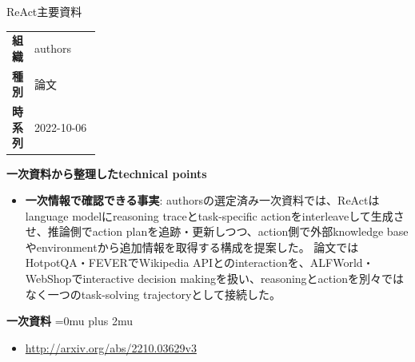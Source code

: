 \begin{technicalnote}{ReAct}{主要資料}
\begingroup
\begin{tabularx}{\linewidth}{@{}>{\bfseries}p{0.22\linewidth}X@{}}
組織 & authors \\
種別 & 論文 \\
時系列 & 2022-10-06 \\
\end{tabularx}
\smallskip
{\bfseries 一次資料から整理したtechnical points}
\begin{itemize}[leftmargin=1.5em,itemsep=0.35em]
\item \textbf{一次情報で確認できる事実}: authorsの選定済み一次資料では、ReActはlanguage modelにreasoning traceとtask-specific actionをinterleaveして生成させ、推論側でaction planを追跡・更新しつつ、action側で外部knowledge baseやenvironmentから追加情報を取得する構成を提案した。 論文ではHotpotQA・FEVERでWikipedia APIとのinteractionを、ALFWorld・WebShopでinteractive decision makingを扱い、reasoningとactionを別々ではなく一つのtask-solving trajectoryとして接続した。
\end{itemize}
\begin{minipage}{\linewidth}
\begin{samepage}
{\bfseries 一次資料}
\begingroup\sloppy
\Urlmuskip=0mu plus 2mu\relax
\begin{itemize}[leftmargin=1.5em,itemsep=0.25em]
\item {\scriptsize\url{http://arxiv.org/abs/2210.03629v3}}
\end{itemize}
\endgroup
\end{samepage}
\end{minipage}
\endgroup
\end{technicalnote}
\medskip

